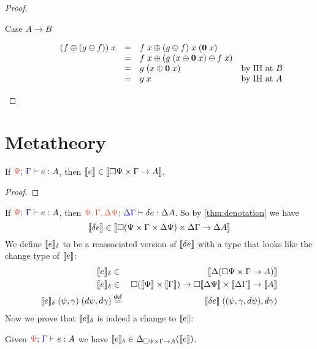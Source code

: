 \documentclass{rntz}
\begin{document}
\begin{proof}
\begin{description}
    \item[Case $A \to B$]
      \[\begin{array}{rcll}
      (f \oplus (g \ominus f))\; x
      &=& f\;x \oplus (g \ominus f)\; x\; (\mathbf{0}\; x)\\
      &=& f\;x \oplus (g \; (x \oplus \mathbf{0}\; x) \ominus f \; x)\\
      &=& g\; (x \oplus \mathbf{0}\; x) & \text{by IH at $B$}\\
      &=& g\; x & \text{by IH at $A$}
      \end{array}\]

  \end{description}
\end{proof}


\section{Metatheory}

\begin{theorem}[Denotation]
  \label{thm:denotation}
  If $\J{\GP}{\GG}{e}{A}$, then $\llbracket{e}\rrbracket \in {\llbracket{\square{\Psi} \times\Gamma\to A}\rrbracket}$.
\end{theorem}
\begin{proof}
\end{proof}

\newcommand{\dendelta}[1]{\den{#1}_\delta}

If $\J{\GP}{\GG}{e}{A}$, then $\J{\GP, \GG, \Ch\GP}{\Ch\GG}{\delta e}{\Ch A}$.
%
So by \cref{thm:denotation} we have
\[\llbracket{\delta e}\rrbracket \in {\llbracket{\square{(\Psi\times\Gamma\times\Delta\Psi)} \times\Delta\Gamma\to \Delta A}\rrbracket}\]
%
We define $\dendelta{e}$ to be a reassociated version of
$\llbracket{\delta e}\rrbracket$ with a type that looks like the change type of $\llbracket{e}\rrbracket$:
%
\begin{eqnarray*}
  \dendelta{e} &\in& \Den{\Ch (\Disc{\GP} \x \GG \to A) }\\
  \dendelta{e} &\in& \Disc{(\Den{\GP} \x \Den{\GG})}
    \to \Disc{\Den{\Ch\GP}} \x \Den{\Ch\GG}  \to \Den{A}\\
  \dendelta{e} \; (\psi, \gamma) \; (d\psi, d\gamma)
  &\defeq& \den{\delta e} \; ((\psi, \gamma, d\psi), d\gamma)
\end{eqnarray*}
%
Now we prove that $\dendelta{e}$ is indeed a change to $\llbracket{e}\rrbracket$:

\begin{theorem}[Legitimacy]
  Given $\J{\GP}{\GG}{e}{A}$ we have
  $\dendelta{e} \in \Change{\Disc{\Psi} \x \GG \to A}{\den{e}}$.
\end{theorem}
\end{document}
